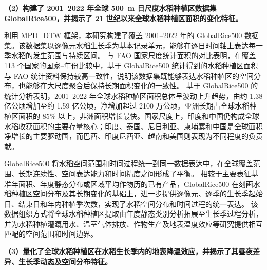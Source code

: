 \noindent\textbf{（2）构建了 2001--2022 年全球 500~m 日尺度水稻种植区数据集 GlobalRice500，并揭示了 21 世纪以来全球水稻种植区面积的变化特征。}

利用 MPD\_DTW 框架，本研究构建了覆盖 2001--2022 年的 GlobalRice500 数据集。该数据集以逐像元水稻生长季为基本记录单元，能够在逐日时间轴上表达每一季水稻的发生范围与持续区间。
与 FAO 国家尺度统计面积的对比表明，在覆盖 113 个国家的国家--年份比较中，基于 GlobalRice500 统计得到的水稻种植区面积与 FAO 统计资料保持较高一致性，说明该数据集既能够表达水稻种植区的空间分布，也能够在大尺度聚合后保持长期面积变化的一致性。
基于 GlobalRice500 的统计分析表明，2001--2022 年全球水稻种植区面积总体呈波动上升趋势，由约 1.38 亿公顷增加至约 1.59 亿公顷，净增加超过 2100 万公顷。亚洲长期占全球水稻种植区面积的 85\% 以上，非洲面积增长最快。国家尺度上，印度和中国仍构成全球水稻收获面积的主要存量核心；印度、泰国、尼日利亚、柬埔寨和中国是全球面积净增长的主要驱动国，而巴西、印度尼西亚、越南和美国则表现为不同程度的负贡献。%

GlobalRice500 将水稻空间范围和时间过程统一到同一数据表达中，在全球覆盖范围、长期连续性、空间表达能力和时间精度之间形成了平衡。
相较于主要表征基准年面积、年度静态分布或区域平均作物历的已有产品，GlobalRice500 在刻画水稻种植区空间分布及其长期变化的基础上，进一步提供逐像元、逐季的生长季起始日、结束日和年内种植季次数，实现了水稻空间分布和时间过程的统一表达。
该数据组织方式将全球水稻种植区提取由年度静态类别分析拓展至生长季过程分析，并为水稻种植灌溉用水、温室气体排放、作物生产及地表温度效应等研究提供相互匹配的空间范围和时间边界。

\noindent\textbf{（3）量化了全球水稻种植区在水稻生长季内的地表降温效应，并揭示了其昼夜差异、生长季动态及空间分布特征。}

